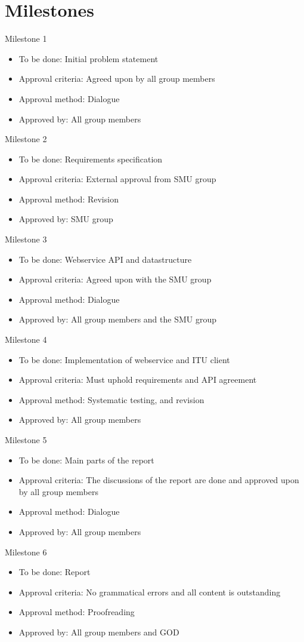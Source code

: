 \section{Milestones}
\label{app:milestones}
Milestone 1
\begin{itemize}
\item To be done: Initial problem statement
\item Approval criteria: Agreed upon by all group members
\item Approval method: Dialogue
\item Approved by: All group members
\end{itemize}

Milestone 2
\begin{itemize}
\item To be done: Requirements specification
\item Approval criteria: External approval from SMU group
\item Approval method: Revision
\item Approved by: SMU group
\end{itemize}

Milestone 3
\begin{itemize}
\item To be done: Webservice API and datastructure
\item Approval criteria: Agreed upon with the SMU group
\item Approval method: Dialogue
\item Approved by: All group members and the SMU group
\end{itemize}

Milestone 4
\begin{itemize}
\item To be done: Implementation of webservice and ITU client 
\item Approval criteria: Must uphold requirements and API agreement
\item Approval method: Systematic testing, and revision
\item Approved by: All group members
\end{itemize}

Milestone 5
\begin{itemize}
\item To be done: Main parts of the report 
\item Approval criteria: The discussions of the report are done and approved upon by all group members
\item Approval method: Dialogue
\item Approved by: All group members
\end{itemize}

Milestone 6
\begin{itemize}
\item To be done: Report
\item Approval criteria: No grammatical errors and all content is outstanding
\item Approval method: Proofreading
\item Approved by: All group members and GOD
\end{itemize}
